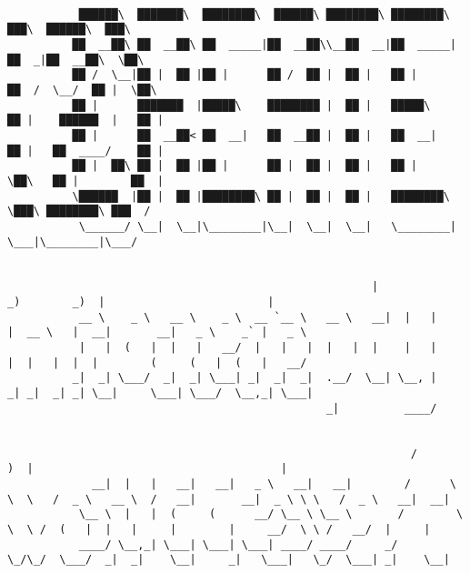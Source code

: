 \documentclass[varwidth=\maxdimen,margin=0.5cm,multi={verbatim}]{standalone}
\begin{document}
\begin{verbatim}

           ██████\  ███████\  ████████\  ██████\ ████████\ ████████\      ███\  ██████\  ███\
          ██  __██\ ██  __██\ ██  _____|██  __██\\__██  __|██  _____|    ██  _|██  __██\  \██\
          ██ /  \__|██ |  ██ |██ |      ██ /  ██ |  ██ |   ██ |         ██  /  \__/  ██ |  \██\
          ██ |      ███████  |█████\    ████████ |  ██ |   █████\       ██ |    ██████  |   ██ |
          ██ |      ██  __██< ██  __|   ██  __██ |  ██ |   ██  __|      ██ |   ██  ____/    ██ |
          ██ |  ██\ ██ |  ██ |██ |      ██ |  ██ |  ██ |   ██ |         \██\   ██ |        ██  |
          \██████  |██ |  ██ |████████\ ██ |  ██ |  ██ |   ████████\     \███\ ████████\ ███  /
           \______/ \__|  \__|\________|\__|  \__|  \__|   \________|      \___|\________|\___/


                                                        |              _)        _)  |                         |
           __ \    _ \   __ \    _ \  __ `__ \   __ \   __|  |   |      |  __ \   |  __|       __|   _ \    _` |   _ \
           |   |  (   |  |   |   __/  |   |   |  |   |  |    |   |      |  |   |  |  |        (     (   |  (   |   __/
          _|  _| \___/  _|  _| \___| _|  _|  _|  .__/  \__| \__, |     _| _|  _| _| \__|     \___| \___/  \__,_| \___|
                                                 _|          ____/


                                                              /                              )  |                                      |
             __|  |   |   __|   __|   _ \   __|   __|        /      \ \  \   /  _ \   __ \  /   __|       __|  _ \ \ \   /  _ \   __|  __|
           \__ \  |   |  (     (      __/ \__ \ \__ \       /        \ \  \ /  (   |  |   |     |        |     __/  \ \ /   __/  |     |
           ____/ \__,_| \___| \___| \___| ____/ ____/     _/          \_/\_/  \___/  _|  _|    \__|     _|   \___|   \_/  \___| _|    \__|



\end{verbatim}
\end{document}
